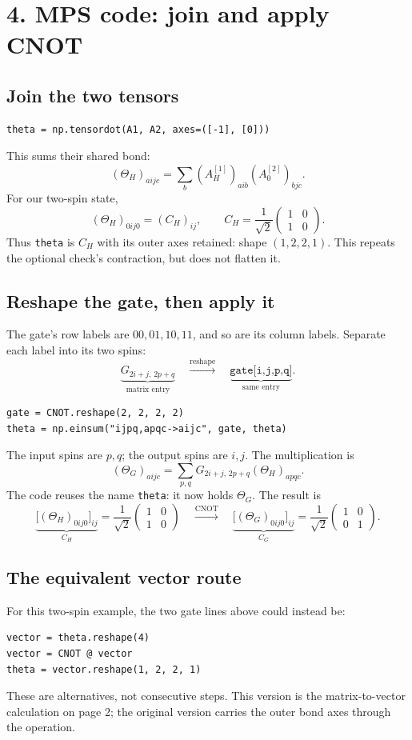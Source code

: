 \documentclass[11pt]{article}
\newcommand{\mtwo}[4]{\begin{pmatrix}#1&#2\\#3&#4\end{pmatrix}}
\begin{document}
\newpage
\section*{4. MPS code: join and apply CNOT}
\subsection*{Join the two tensors}
\begin{lstlisting}
theta = np.tensordot(A1, A2, axes=([-1], [0]))
\end{lstlisting}
This sums their shared bond:
\[
(\Theta_H)_{aijc}=\sum_b (A_H^{[1]})_{aib}(A_0^{[2]})_{bjc}.
\]
For our two-spin state,
\[
\boxed{(\Theta_H)_{0ij0}=(C_H)_{ij}},\qquad
C_H=\frac1{\sqrt2}\mtwo{1}{0}{1}{0}.
\]
Thus \texttt{theta} is $C_H$ with its outer axes retained: shape $(1,2,2,1)$. This repeats the optional check's contraction, but does not flatten it.

\subsection*{Reshape the gate, then apply it}
The gate's row labels are $00,01,10,11$, and so are its column labels. Separate each label into its two spins:
\[
\underbrace{G_{2i+j,\,2p+q}}_{\text{matrix entry}}
\quad\xrightarrow{\text{reshape}}\quad
\underbrace{\texttt{gate[i,j,p,q]}}_{\text{same entry}}.
\]
\begin{lstlisting}
gate = CNOT.reshape(2, 2, 2, 2)
theta = np.einsum("ijpq,apqc->aijc", gate, theta)
\end{lstlisting}
The input spins are $p,q$; the output spins are $i,j$. The multiplication is
\[
(\Theta_G)_{aijc}
=\sum_{p,q}G_{2i+j,\,2p+q}(\Theta_H)_{apqc}.
\]
The code reuses the name \texttt{theta}: it now holds $\Theta_G$. The result is
\[
\underbrace{\bigl[(\Theta_H)_{0ij0}\bigr]_{ij}}_{C_H}
=\frac1{\sqrt2}\mtwo{1}{0}{1}{0}
\quad\xrightarrow{\text{CNOT}}\quad
\underbrace{\bigl[(\Theta_G)_{0ij0}\bigr]_{ij}}_{C_G}
=\frac1{\sqrt2}\mtwo{1}{0}{0}{1}.
\]
\subsection*{The equivalent vector route}
For this two-spin example, the two gate lines above could instead be:
\begin{lstlisting}
vector = theta.reshape(4)
vector = CNOT @ vector
theta = vector.reshape(1, 2, 2, 1)
\end{lstlisting}
These are alternatives, not consecutive steps. This version is the matrix-to-vector calculation on page 2; the original version carries the outer bond axes through the operation.
\end{document}
